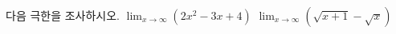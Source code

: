 다음 극한을 조사하시오.
 $\displaystyle\lim_{x\to\infty}(2x^2-3x+4)$
 $\displaystyle\lim_{x\to\infty}(\sqrt{x+1}-\sqrt{x})$

